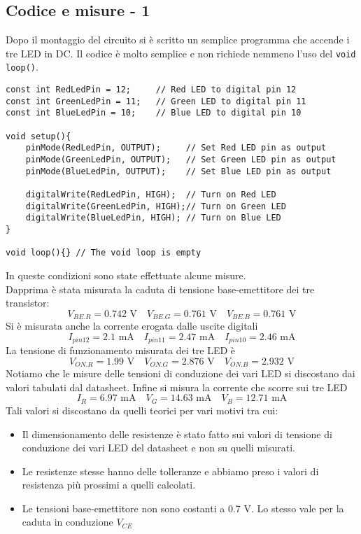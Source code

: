 \subsection{Codice e misure - 1}
Dopo il montaggio del circuito si è scritto un semplice programma che accende i tre LED in DC. Il codice è molto semplice e non richiede nemmeno l'uso del \texttt{void loop()}.
\begin{lstlisting}[frame=single, language=Arduino]
const int RedLedPin = 12;     // Red LED to digital pin 12
const int GreenLedPin = 11;   // Green LED to digital pin 11
const int BlueLedPin = 10;    // Blue LED to digital pin 10

void setup(){
    pinMode(RedLedPin, OUTPUT);     // Set Red LED pin as output
    pinMode(GreenLedPin, OUTPUT);   // Set Green LED pin as output
    pinMode(BlueLedPin, OUTPUT);    // Set Blue LED pin as output
    
    digitalWrite(RedLedPin, HIGH);  // Turn on Red LED
    digitalWrite(GreenLedPin, HIGH);// Turn on Green LED
    digitalWrite(BlueLedPin, HIGH); // Turn on Blue LED
}

void loop(){} // The void loop is empty
\end{lstlisting}
In queste condizioni sono state effettuate alcune misure.\\ 
Dapprima è stata misurata la caduta di tensione base-emettitore dei tre transistor:
\begin{equation*}
    V_{BE.R}=0.742\text{ V}\quad V_{BE.G}=0.761\text{ V}\quad V_{BE.B}=0.761\text{ V}
\end{equation*}
Si è misurata anche la corrente erogata dalle uscite digitali
\begin{equation*}
    I_{pin12}=2.1\text{ mA}\quad I_{pin11}=2.47\text{ mA} \quad I_{pin10}=2.46\text{ mA} 
\end{equation*}
La tensione di funzionamento misurata dei tre LED è
\begin{equation*}
    V_{ON.R}=1.99\text{ V}\quad V_{ON.G}=2.876\text{ V}\quad V_{ON.B}=2.932\text{ V}
\end{equation*}
Notiamo che le misure delle tensioni di conduzione dei vari LED si discostano dai valori tabulati dal datasheet. Infine si misura la corrente che scorre sui tre LED
\begin{equation*}
    I_{R}=6.97\text{ mA}\quad V_{G}=14.63\text{ mA}\quad V_{B}=12.71\text{ mA}
\end{equation*}
Tali valori si discostano da quelli teorici per vari motivi tra cui:
\begin{itemize}
    \item Il dimensionamento delle resistenze è stato fatto sui valori di tensione di conduzione dei vari LED del datasheet e non su quelli misurati.
    \item Le resistenze stesse hanno delle tolleranze e abbiamo preso i valori di resistenza più prossimi a quelli calcolati.
    \item Le tensioni base-emettitore non sono costanti a 0.7 V. Lo stesso vale per la caduta in conduzione $V_{CE}$
\end{itemize}
